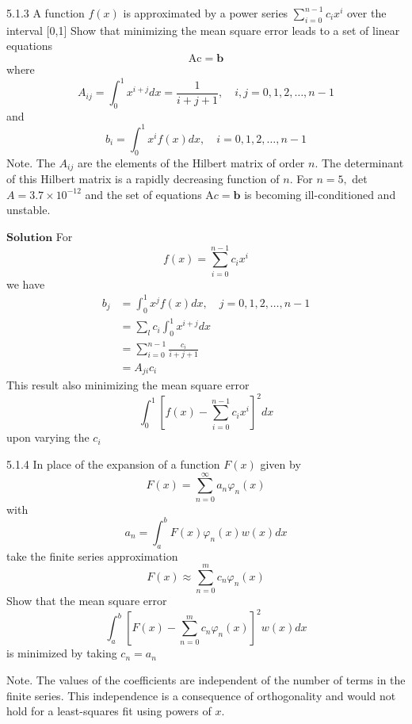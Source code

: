 \newpage

\begin{mybox}{5.1.3}
A function $f(x)$ is approximated by a power series $\sum_{i=0}^{n-1} c_{i} x^{i}$ over the interval [0,1] Show that minimizing the mean square error leads to a set of linear equations
$$
\mathrm{Ac}=\mathbf{b}
$$
where
$$
A_{i j}=\int_{0}^{1} x^{i+j} d x=\frac{1}{i+j+1}, \quad i, j=0,1,2, \ldots, n-1
$$
and
$$
b_{i}=\int_{0}^{1} x^{i} f(x) d x, \quad i=0,1,2, \ldots, n-1
$$
Note. The $A_{i j}$ are the elements of the Hilbert matrix of order $n$. The determinant of this Hilbert matrix is a rapidly decreasing function of $n .$ For $n=5,$ det $A=3.7 \times 10^{-12}$ and the set of equations $\mathrm{A} c=\mathbf{b}$ is becoming ill-conditioned and unstable.
\end{mybox}
$\boxed{\textbf{Solution}}$ For 
$$f(x)=\sum_{i=0}^{n-1} c_{i} x^{i}$$
we have
$$
\begin{aligned}
b_{j} &=\int_{0}^{1} x^{j} f(x) d x, \quad j=0,1,2, \ldots, n-1 \\
&=\sum_{l} c_{i} \int_{0}^{1} x^{i+j} d x \\
&=\sum_{i=0}^{n-1} \frac{c_{i}}{i+j+1} \\
&=A_{j i} c_{i}
\end{aligned}
$$
This result also minimizing the mean square error $$\int_{0}^{1}\left[f(x)-\sum_{i=0}^{n-1} c_{i} x^{i}\right]^{2} d x$$ 
upon varying the $c_{i}$

\newpage

\begin{mybox}{5.1.4}
In place of the expansion of a function $F(x)$ given by
$$
F(x)=\sum_{n=0}^{\infty} a_{n} \varphi_{n}(x)
$$
with
$$
a_{n}=\int_{a}^{b} F(x) \varphi_{n}(x) w(x) d x
$$
take the finite series approximation
$$
F(x) \approx \sum_{n=0}^{m} c_{n} \varphi_{n}(x)
$$
Show that the mean square error
$$
\int_{a}^{b}\left[F(x)-\sum_{n=0}^{m} c_{n} \varphi_{n}(x)\right]^{2} w(x) d x
$$
is minimized by taking $c_{n}=a_{n}$

Note. The values of the coefficients are independent of the number of terms in the finite series. This independence is a consequence of orthogonality and would not hold for a least-squares fit using powers of $x$.
\end{mybox}




